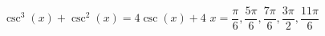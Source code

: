 { $\csc^{3}(x) + \csc^{2}(x) = 4\csc(x) + 4$}
{ $x = \dfrac{\pi}{6}, \dfrac{5\pi}{6}, \dfrac{7\pi}{6}, \dfrac{3\pi}{2}, \dfrac{11\pi}{6}$}
